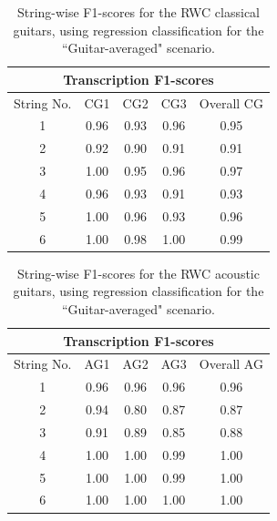 \documentclass[12pt]{cmuthesis}
\begin{document}
\begin{table}[!htbp]
\begin{center}
\begin{tabular}{||c|c|c|c|c||}
\hline
\multicolumn{5}{||c||}{\bf{Transcription F1-scores}} \\
\hline
String No. & CG1 & CG2 & CG3 & Overall CG \\
\hline
1 & 0.96 & 0.93 & 0.96 & 0.95\\
\hline
2 & 0.92 & 0.90 & 0.91 & 0.91\\
\hline
3 & 1.00 & 0.95 & 0.96 & 0.97\\
\hline
4 & 0.96 & 0.93 & 0.91 & 0.93\\
\hline
5 & 1.00 & 0.96 & 0.93 & 0.96 \\
\hline
6 & 1.00 & 0.98 & 1.00 & 0.99\\ 
\hline
\hline
\end{tabular}
\caption{String-wise F1-scores for the RWC classical guitars, using regression classification for the ``Guitar-averaged" scenario.} 
\label{tab:cg-str-f}
\end{center}
\end{table}

\begin{table}[!htbp]
\begin{center}
\begin{tabular}{||c||c|c|c|c||}
\hline
\multicolumn{5}{||c||}{\bf{Transcription F1-scores}} \\
\hline
String No. & AG1 & AG2 & AG3 & Overall AG \\
\hline
1 &  0.96 & 0.96 & 0.96 & 0.96 \\
\hline
2 & 0.94 & 0.80 & 0.87 &  0.87\\
\hline
3 & 0.91 & 0.89 & 0.85 & 0.88\\
\hline
4 & 1.00 & 1.00 & 0.99 &  1.00 \\
\hline
5 & 1.00 & 1.00 & 0.99 &  1.00 \\
\hline
6 & 1.00 & 1.00 & 1.00 & 1.00 \\ 
\hline
\hline
\end{tabular}
\caption{String-wise F1-scores for the RWC acoustic guitars, using regression classification for the ``Guitar-averaged" scenario.} 
\label{tab:ag-str-f}
\end{center}
\end{table}
\end{document}
